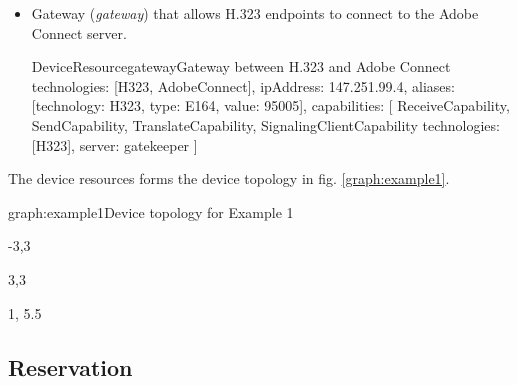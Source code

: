 \begin{itemize}
\begin{EntityExample}{DeviceResource}{client2}{Second Adobe Connect client}
technologies: [AdobeConnect], 
persons: [UserIdentity(bouda@cesnet.cz)],
capabilities: [
  ReceiveCapability, SendCapability, TerminalCapability
]
\end{EntityExample}

\item Gateway (\emph{gateway}) that allows H.323 endpoints to connect to
  the Adobe Connect server.
    
\begin{EntityExample}{DeviceResource}{gateway}{Gateway between H.323 and Adobe Connect}
technologies: [H323, AdobeConnect], 
ipAddress: 147.251.99.4,
aliases: [{technology: H323, type: E164, value: 95005}],
capabilities: [
  ReceiveCapability, SendCapability,
  TranslateCapability,
  SignalingClientCapability {technologies: [H323], server: gatekeeper}
]
\end{EntityExample}

\end{itemize}

The device resources forms the device topology in fig. \ref{graph:example1}. 

\begin{Graph}{graph:example1}{Device topology for Example 1}  
  \begin{SubGraph}{-3,3}{}
  \end{SubGraph}
  
  \begin{SubGraph}{3,3}{}
  \end{SubGraph}
  
  
  \begin{GraphLegend}{1, 5.5}
  \end{GraphLegend}
\end{Graph}

\subsection{Reservation}

 \\
 \\
